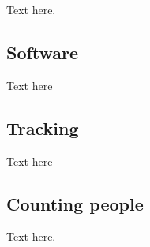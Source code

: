 Text here.

\subsection{Software}
Text here

\subsection{Tracking}
Text here

\subsection{Counting people}
Text here.
